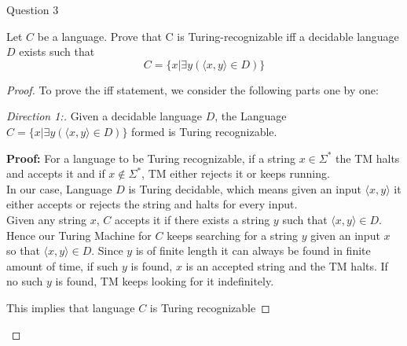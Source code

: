 \begin{solution}{Question 3}\label{ques:3}
    \begin{question}
        Let $C$ be a language. Prove that C is Turing-recognizable iff a decidable language $D$ exists such that
        $$C = \{ x | \exists y (\langle x,y \rangle \in D) \}$$
    \end{question}
    \tcblower{}
    \begin{proof}
      To prove the iff statement, we consider the following parts one by one:
      \begin{proof}[Direction 1:]
        Given a decidable language $D$, the Language $C = \{ x | \exists y (\langle x,y \rangle \in D) \}$ formed is Turing recognizable.\par
        \textbf{Proof:}
        For a language to be Turing recognizable, if a string $x \in \Sigma^*$ the TM halts and accepts it and if $x \not\in \Sigma^*$, TM either rejects it or keeps running.\\
        In our case, Language $D$ is Turing decidable, which means given an input $\langle x,y \rangle$ it either accepts or rejects the string and halts for every input.\\
        Given any string $x$, $C$ accepts it if there exists a string $y$ such that $\langle x,y \rangle \in D$. Hence our Turing Machine for $C$ keeps searching for a string $y$ given an input $x$ so that $\langle x,y \rangle \in D$. Since $y$ is of finite length it can always be found in finite amount of time, if such $y$ is found, $x$ is an accepted string and the TM halts. If no such $y$ is found, TM keeps looking for it indefinitely.\par
        This implies that language $C$ is Turing recognizable
      \end{proof}
      

\end{proof}
\end{solution}
